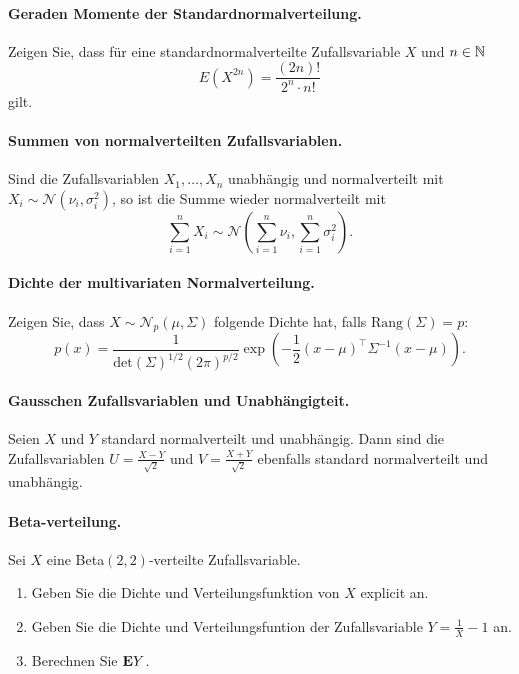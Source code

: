 \paragraph{Geraden Momente der Standardnormalverteilung. } Zeigen Sie, dass für eine
standardnormalverteilte Zufallsvariable $X$ und $n \in \mathbb N$
\begin{equation*}
    E\left( X^{2n} \right) = \frac{(2n)!}{2^n \cdot n!}
\end{equation*}
gilt. %

\paragraph{Summen von normalverteilten Zufallsvariablen. }
Sind die Zufallsvariablen $X_1,\ldots,X_n$ unabhängig und normalverteilt
mit $X_i \sim \mathcal N (\nu_i, \sigma_i^2)$, so ist die Summe
wieder normalverteilt mit 
\begin{equation*}
    \sum_{i=1}^{n} X_i \sim 
    \mathcal N \left( \sum_{i=1}^{n} \nu_i, \sum_{i=1}^{n} \sigma_i^2 \right). 
\end{equation*} %

\paragraph{Dichte der multivariaten Normalverteilung. } Zeigen Sie, dass 
$X \sim \mathcal N_p\left( \mu, \Sigma \right) $ folgende Dichte hat, falls 
$\textrm{Rang}(\Sigma)=p$: 
\begin{equation*}
    p(x) = \frac{1}{ \textrm{det}(\Sigma)^{1/2} (2\pi)^{p/2}} \exp\left( - \frac{1}{2} (x  - \mu)^\top \Sigma^{-1} (x - \mu) \right).
\end{equation*} %

\paragraph{Gausschen Zufallsvariablen und Unabhängigteit. } Seien $X$ und $Y$
standard normalverteilt und unabhängig. Dann sind die Zufallsvariablen $U =
\frac{X-Y}{\sqrt{2}}$ und $V=\frac{X+Y}{\sqrt{2}}$ ebenfalls standard
normalverteilt und unabhängig. 


\paragraph{Beta-verteilung.} Sei $X$ eine Beta$(2,2)$-verteilte Zufallsvariable.
\begin{enumerate}
    \item Geben Sie die Dichte und Verteilungsfunktion von $X$ explicit an. 
    \item Geben Sie die Dichte und Verteilungsfuntion der Zufallsvariable
        $Y = \frac{1}{X} - 1$ an. 
    \item Berechnen Sie $\mathbf{E} Y$.  
\end{enumerate}


